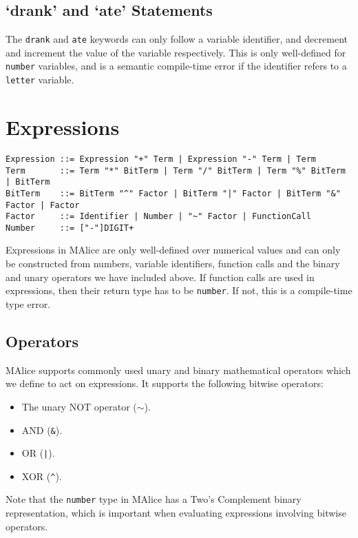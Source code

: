 \documentclass[a4wide, 11pt]{article}
\begin{document}
\subsection{`drank' and `ate' Statements}

The \texttt{drank} and \texttt{ate} keywords can only follow a variable identifier, and decrement and increment the value of the variable respectively. This is only well-defined for \texttt{number} variables, and is a semantic compile-time error if the identifier refers to a \texttt{letter} variable.
  
\section{Expressions}

\begin{verbatim}
Expression ::= Expression "+" Term | Expression "-" Term | Term
Term       ::= Term "*" BitTerm | Term "/" BitTerm | Term "%" BitTerm | BitTerm
BitTerm    ::= BitTerm "^" Factor | BitTerm "|" Factor | BitTerm "&" Factor | Factor
Factor     ::= Identifier | Number | "~" Factor | FunctionCall
Number     ::= ["-"]DIGIT+ 
\end{verbatim}

Expressions in MAlice are only well-defined over numerical values and can only be constructed from numbers, variable identifiers, function calls and the binary and unary operators we have included above. If function calls are used in expressions, then their return type has to be \texttt{number}. If not, this is a compile-time type error.

\subsection{Operators}

MAlice supports commonly used unary and binary mathematical operators which we define to act on expressions. It supports the following bitwise operators:

\begin{itemize}

\item The unary NOT operator ($\sim$).
\item AND (\texttt{\&}).
\item OR (\texttt{|}).
\item XOR (\texttt{\^}).

\end{itemize}

Note that the \texttt{number} type in MAlice has a Two's Complement binary representation, which is important when evaluating expressions involving bitwise operators.
\end{document}
